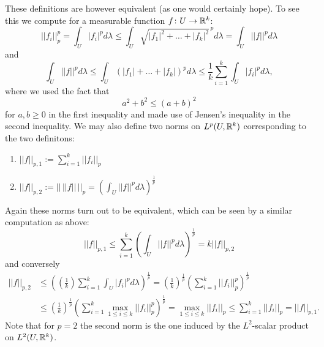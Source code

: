 These definitions are however equivalent (as one would certainly hope). To see this we compute for a measurable function $f \colon U \to \mathbb{R}^k$:
\[
    ||f_i||_p^p = \int_U |f_i|^p d\lambda \leq \int_U \sqrt{|f_1|^2 + \ldots + |f_k|^2}^{\,p} d\lambda = \int_U ||f||^p d\lambda
\]
and 
\[
\int_U ||f||^p d\lambda \leq \int_U (|f_1| + \ldots + |f_k|)^p d\lambda \leq \frac{1}{k} \sum_{i=1}^{k} \int_U |f_i|^p d\lambda,
\]
where we used the fact that 
\[
a^2 + b^2 \leq (a+b)^2
\]
for $a,b \geq 0$ in the first inequality and made use of Jensen's inequality in the second inequality. We may also define two norms on $L^p(U,\mathbb{R}^k)$ corresponding to the two definitons:
\begin{enumerate}
    \item $||f||_{p,1} := \sum_{i=1}^{k} ||f_i||_p$
    \item $||f||_{p,2} := || \,||f||\, ||_p =\left( \int_U ||f||^p d\lambda\right)^{\frac{1}{p}}$
\end{enumerate} 
Again these norms turn out to be equivalent, which can be seen by a similar computation as above:
\[
||f||_{p,1} \leq \sum_{i=1}^{k}\left( \int_U ||f||^p d\lambda\right)^{\frac{1}{p}} = k ||f||_{p,2}
\]
and conversely 
\begin{align*}
    ||f||_{p,2} &\leq \left(\left(\frac{1}{k}\right)\sum_{i=1}^{k} \int_U |f_i|^p d\lambda\right)^{\frac{1}{p}} = \left(\frac{1}{k}\right)^{\frac{1}{p}} \left( \sum_{i=1}^{k} ||f_i||_p^p\right)^{\frac{1}{p}} \\
    &\leq \left(\frac{1}{k}\right)^{\frac{1}{p}}\left( \sum_{i=1}^{k} \max_{1\leq i\leq k} ||f_i||_p^p\right)^{\frac{1}{p}} =\max_{1\leq i\leq k} ||f_i||_p \leq \sum_{i=1}^{k} ||f_i||_p = ||f||_{p,1}.
\end{align*}
Note that for $p=2$ the second norm is the one induced by the $L^2$-scalar product on $L^2(U,\mathbb{R}^k)$.